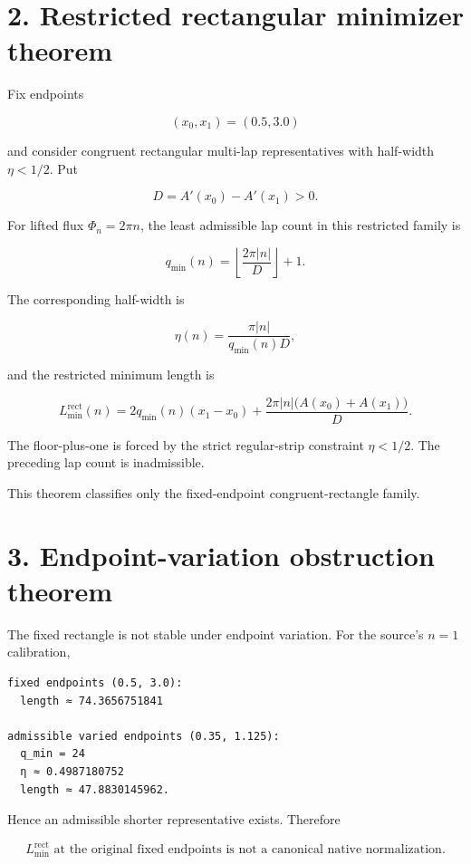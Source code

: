 \hypertarget{restricted-rectangular-minimizer-theorem}{%
\section{2. Restricted rectangular minimizer theorem}\label{restricted-rectangular-minimizer-theorem}}

Fix endpoints

\[
(x_0,x_1)=(0.5,3.0)
\]

and consider congruent rectangular multi-lap representatives with half-width \(\eta<1/2\). Put

\[
D=A'(x_0)-A'(x_1)>0.
\]

For lifted flux \(\Phi_n=2\pi n\), the least admissible lap count in this restricted family is

\[
\boxed{
q_{\min}(n)=\left\lfloor\frac{2\pi|n|}{D}\right\rfloor+1.
}
\]

The corresponding half-width is

\[
\boxed{
\eta(n)=\frac{\pi|n|}{q_{\min}(n)D},
}
\]

and the restricted minimum length is

\[
\boxed{
L_{\min}^{\mathrm{rect}}(n)
=2q_{\min}(n)(x_1-x_0)
+\frac{2\pi|n|\bigl(A(x_0)+A(x_1)\bigr)}{D}.
}
\]

The floor-plus-one is forced by the strict regular-strip constraint \(\eta<1/2\). The preceding lap count is inadmissible.

This theorem classifies only the fixed-endpoint congruent-rectangle family.

\hypertarget{endpoint-variation-obstruction-theorem}{%
\section{3. Endpoint-variation obstruction theorem}\label{endpoint-variation-obstruction-theorem}}

The fixed rectangle is not stable under endpoint variation. For the source's \(n=1\) calibration,

\begin{verbatim}
fixed endpoints (0.5, 3.0):
  length ≈ 74.3656751841

admissible varied endpoints (0.35, 1.125):
  q_min = 24
  η ≈ 0.4987180752
  length ≈ 47.8830145962.
\end{verbatim}

Hence an admissible shorter representative exists. Therefore

\[
\boxed{
L_{\min}^{\mathrm{rect}}\text{ at the original fixed endpoints is not a canonical native normalization}.
}
\]

